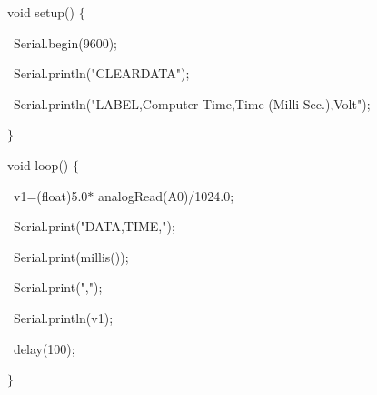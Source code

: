 \documentclass[12pt]{article}
\begin{document}
{\fontsize{14pt}{16.8pt}\selectfont void setup() $ \{ $ \par}\par

{\fontsize{14pt}{16.8pt}\selectfont \  Serial.begin(9600);\par}\par

{\fontsize{14pt}{16.8pt}\selectfont \  Serial.println("CLEARDATA");\par}\par

{\fontsize{14pt}{16.8pt}\selectfont \  Serial.println("LABEL,Computer Time,Time (Milli Sec.),Volt");\par}\par

\vspace{\baselineskip}
{\fontsize{14pt}{16.8pt}\selectfont $ \} $ \par}\par

\vspace{\baselineskip}
{\fontsize{14pt}{16.8pt}\selectfont void loop() $ \{ $ \par}\par

{\fontsize{14pt}{16.8pt}\selectfont \  v1=(float)5.0$\ast$ analogRead(A0)/1024.0;\par}\par

{\fontsize{14pt}{16.8pt}\selectfont \  Serial.print("DATA,TIME,");\par}\par

{\fontsize{14pt}{16.8pt}\selectfont \  Serial.print(millis());\par}\par

{\fontsize{14pt}{16.8pt}\selectfont \  Serial.print(",");\par}\par

{\fontsize{14pt}{16.8pt}\selectfont \  Serial.println(v1);\par}\par

{\fontsize{14pt}{16.8pt}\selectfont \  delay(100);\par}\par

{\fontsize{14pt}{16.8pt}\selectfont $ \} $ \par}\par
\end{document}
